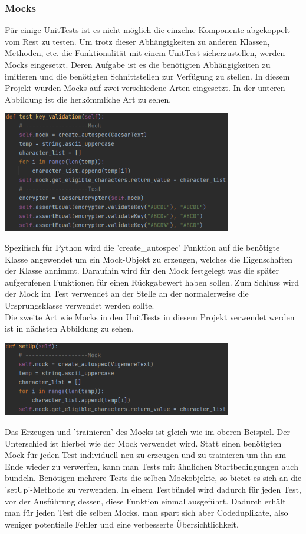 \documentclass[12pt]{article}
\begin{document}
\subsubsection{Mocks}
Für einige UnitTests ist es nicht möglich die einzelne Komponente abgekoppelt vom Rest zu testen. Um trotz dieser Abhängigkeiten zu anderen Klassen, Methoden, etc. die Funktionalität mit einem UnitTest sicherzustellen, werden Mocks eingesetzt. Deren Aufgabe ist es die benötigten Abhängigkeiten zu imitieren und die benötigten Schnittstellen zur Verfügung zu stellen. In diesem Projekt wurden Mocks auf zwei verschiedene Arten eingesetzt. In der unteren Abbildung ist die herkömmliche Art zu sehen.
\begin{center}
	\includegraphics[width=10cm]{bilder/Mocks1.png}
\end{center}
Spezifisch für Python wird die 'create\_autospec' Funktion auf die benötigte Klasse angewendet um ein Mock-Objekt zu erzeugen, welches die Eigenschaften der Klasse annimmt. Daraufhin wird für den Mock festgelegt was die später aufgerufenen Funktionen für einen Rückgabewert haben sollen. Zum Schluss wird der Mock im Test verwendet an der Stelle an der normalerweise die Ursprungsklasse verwendet werden sollte.\\
Die zweite Art wie Mocks in den UnitTests in diesem Projekt verwendet werden ist in nächsten Abbildung zu sehen.
\begin{center}
	\includegraphics[width=10cm]{bilder/Mocks2.png}
\end{center}
Das Erzeugen und 'trainieren' des Mocks ist gleich wie im oberen Beispiel. Der Unterschied ist hierbei wie der Mock verwendet wird. Statt einen benötigten Mock für jeden Test individuell neu zu erzeugen und zu trainieren um ihn am Ende wieder zu verwerfen, kann man Tests mit ähnlichen Startbedingungen auch bündeln. Benötigen mehrere Tests die selben Mockobjekte, so bietet es sich an die 'setUp'-Methode zu verwenden. In einem Testbündel wird dadurch für jeden Test, vor der Ausführung dessen, diese Funktion einmal ausgeführt. Dadurch erhält man für jeden Test die selben Mocks, man spart sich aber Codeduplikate, also weniger potentielle Fehler und eine verbesserte Übersichtlichkeit. 
\end{document}
